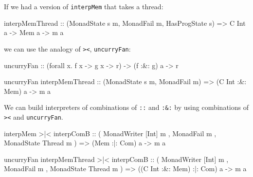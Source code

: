 \documentclass[]{article}
\newenvironment{Shaded}{}{}
\newcommand{\DataTypeTok}[1]{\textcolor[rgb]{0.56,0.13,0.00}{#1}}
\newcommand{\FunctionTok}[1]{\textcolor[rgb]{0.02,0.16,0.49}{#1}}
\newcommand{\NormalTok}[1]{#1}
\newcommand{\OtherTok}[1]{\textcolor[rgb]{0.00,0.44,0.13}{#1}}
\begin{document}
If we had a version of \texttt{interpMem} that takes a thread:

\begin{Shaded}
\begin{Highlighting}[]
\NormalTok{interpMemThread}
\OtherTok{    ::}\NormalTok{ (}\DataTypeTok{MonadState}\NormalTok{ s m, }\DataTypeTok{MonadFail}\NormalTok{ m, }\DataTypeTok{HasProgState}\NormalTok{ s)}
    \OtherTok{=>} \DataTypeTok{C} \DataTypeTok{Int}\NormalTok{ a}
    \OtherTok{->} \DataTypeTok{Mem}\NormalTok{ a}
    \OtherTok{->}\NormalTok{ m a}
\end{Highlighting}
\end{Shaded}

we can use the analogy of \texttt{\textgreater{}\textbar{}\textless{}},
\texttt{uncurryFan}:

\begin{Shaded}
\begin{Highlighting}[]
\NormalTok{uncurryFan}
\OtherTok{    ::}\NormalTok{ (forall x}\FunctionTok{.}\NormalTok{ f x }\OtherTok{->}\NormalTok{ g x }\OtherTok{->}\NormalTok{ r)}
    \OtherTok{->}\NormalTok{ (f }\FunctionTok{:&:}\NormalTok{ g) a}
    \OtherTok{->}\NormalTok{ r}

\NormalTok{uncurryFan interpMemThread}
\OtherTok{    ::}\NormalTok{ (}\DataTypeTok{MonadState}\NormalTok{ s m, }\DataTypeTok{MonadFail}\NormalTok{ m)}
    \OtherTok{=>}\NormalTok{ (}\DataTypeTok{C} \DataTypeTok{Int} \FunctionTok{:&:} \DataTypeTok{Mem}\NormalTok{) a}
    \OtherTok{->}\NormalTok{ m a}
\end{Highlighting}
\end{Shaded}

We can build interpreters of combinations of \texttt{:\textbar{}:} and
\texttt{:\&:} by using combinations of
\texttt{\textgreater{}\textbar{}\textless{}} and \texttt{uncurryFan}.

\begin{Shaded}
\begin{Highlighting}[]
\NormalTok{interpMem }\FunctionTok{>|<}\NormalTok{ interpComB}
\OtherTok{    ::}\NormalTok{ ( }\DataTypeTok{MonadWriter}\NormalTok{ [}\DataTypeTok{Int}\NormalTok{] m}
\NormalTok{       , }\DataTypeTok{MonadFail}\NormalTok{ m}
\NormalTok{       , }\DataTypeTok{MonadState} \DataTypeTok{Thread}\NormalTok{ m}
\NormalTok{       )}
    \OtherTok{=>}\NormalTok{ (}\DataTypeTok{Mem} \FunctionTok{:|:} \DataTypeTok{Com}\NormalTok{) a}
    \OtherTok{->}\NormalTok{ m a}

\NormalTok{uncurryFan interpMemThread }\FunctionTok{>|<}\NormalTok{ interpComB}
\OtherTok{    ::}\NormalTok{ ( }\DataTypeTok{MonadWriter}\NormalTok{ [}\DataTypeTok{Int}\NormalTok{] m}
\NormalTok{       , }\DataTypeTok{MonadFail}\NormalTok{ m}
\NormalTok{       , }\DataTypeTok{MonadState} \DataTypeTok{Thread}\NormalTok{ m}
\NormalTok{       )}
    \OtherTok{=>}\NormalTok{ ((}\DataTypeTok{C} \DataTypeTok{Int} \FunctionTok{:&:} \DataTypeTok{Mem}\NormalTok{) }\FunctionTok{:|:} \DataTypeTok{Com}\NormalTok{) a}
    \OtherTok{->}\NormalTok{ m a}
\end{Highlighting}
\end{Shaded}
\end{document}
